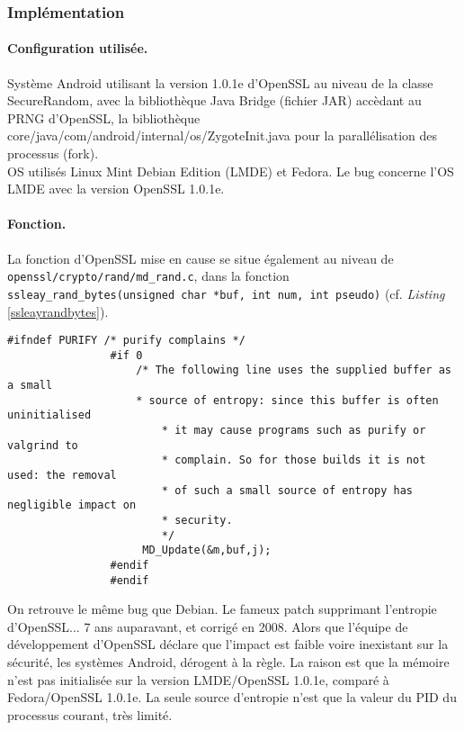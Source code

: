 		
		\subsubsection{Implémentation}
			
			\paragraph{Configuration utilisée.\\}

			Système Android utilisant la version 1.0.1e d'OpenSSL au niveau de la classe SecureRandom, avec la bibliothèque Java Bridge (fichier JAR) accèdant au PRNG d'OpenSSL, la bibliothèque core/java/com/android/internal/os/ZygoteInit.java pour la parallélisation des processus (fork).\\
			
			OS utilisés Linux Mint Debian Edition (LMDE) et Fedora. Le bug concerne l'OS LMDE avec la version OpenSSL 1.0.1e. 

			\paragraph{Fonction.\\}
			
			La fonction d'OpenSSL mise en cause se situe également au niveau de \texttt{openssl/crypto/rand/md\_rand.c}, dans la fonction \texttt{ssleay\_rand\_bytes(unsigned char *buf, int num, int pseudo)} (cf. \textit{Listing} \ref{ssleayrandbytes}).
		
			\begin{lstlisting}[style=customc,caption=ssleay\_rand\_bytes.c,
			 label=ssleayrandbytes]
				#ifndef PURIFY /* purify complains */
				#if 0
				    /* The following line uses the supplied buffer as a small
				    * source of entropy: since this buffer is often uninitialised
				        * it may cause programs such as purify or valgrind to
				        * complain. So for those builds it is not used: the removal
				        * of such a small source of entropy has negligible impact on
				        * security.
				        */
				     MD_Update(&m,buf,j);
				#endif
				#endif
			\end{lstlisting}
			
			On retrouve le même bug que Debian. Le fameux patch supprimant l'entropie d'OpenSSL... 7 ans auparavant, et corrigé en 2008. Alors que l'équipe de développement d'OpenSSL déclare que l'impact est faible voire inexistant sur la sécurité, les systèmes Android, dérogent à la règle. La raison est que la mémoire n'est pas initialisée sur la version LMDE/OpenSSL 1.0.1e, comparé à Fedora/OpenSSL 1.0.1e. La seule source d'entropie n'est que la valeur du PID du processus courant, très limité.

